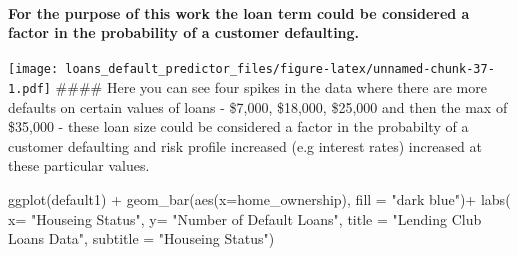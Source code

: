 \documentclass[
]{article}
\newenvironment{Shaded}{\begin{snugshade}}{\end{snugshade}}
\newcommand{\AttributeTok}[1]{\textcolor[rgb]{0.77,0.63,0.00}{#1}}
\newcommand{\FunctionTok}[1]{\textcolor[rgb]{0.00,0.00,0.00}{#1}}
\newcommand{\NormalTok}[1]{#1}
\newcommand{\SpecialCharTok}[1]{\textcolor[rgb]{0.00,0.00,0.00}{#1}}
\newcommand{\StringTok}[1]{\textcolor[rgb]{0.31,0.60,0.02}{#1}}
\begin{document}
\hypertarget{for-the-purpose-of-this-work-the-loan-term-could-be-considered-a-factor-in-the-probability-of-a-customer-defaulting.}{%
\paragraph{For the purpose of this work the loan term could be
considered a factor in the probability of a customer
defaulting.}\label{for-the-purpose-of-this-work-the-loan-term-could-be-considered-a-factor-in-the-probability-of-a-customer-defaulting.}}

\begin{Shaded}
\end{Shaded}

\texttt{[image: loans\_default\_predictor\_files/figure-latex/unnamed-chunk-37-1.pdf]}
\#\#\#\# Here you can see four spikes in the data where there are more
defaults on certain values of loans - \$7,000, \$18,000, \$25,000 and
then the max of \$35,000 - these loan size could be considered a factor
in the probabilty of a customer defaulting and risk profile increased
(e.g interest rates) increased at these particular values.

\begin{Shaded}
\begin{Highlighting}[]
\FunctionTok{ggplot}\NormalTok{(default1) }\SpecialCharTok{+}
  \FunctionTok{geom\_bar}\NormalTok{(}\FunctionTok{aes}\NormalTok{(}\AttributeTok{x=}\NormalTok{home\_ownership), }\AttributeTok{fill =} \StringTok{"dark blue"}\NormalTok{)}\SpecialCharTok{+}
   \FunctionTok{labs}\NormalTok{( }\AttributeTok{x=} \StringTok{"Houseing Status"}\NormalTok{,}
        \AttributeTok{y=} \StringTok{"Number of Default Loans"}\NormalTok{,}
        \AttributeTok{title =} \StringTok{"Lending Club Loans Data"}\NormalTok{,}
        \AttributeTok{subtitle =} \StringTok{"Houseing Status"}\NormalTok{)}
\end{Highlighting}
\end{Shaded}
\end{document}
